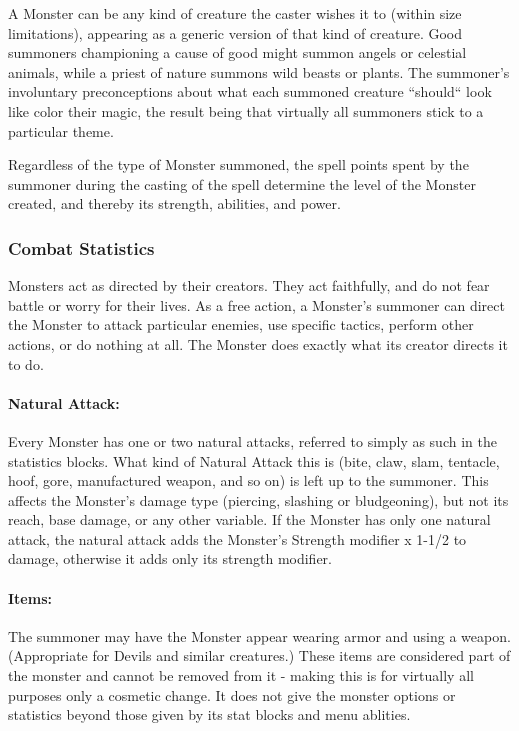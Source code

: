 A Monster can be any kind of creature the caster wishes it to (within size limitations), 
appearing as a generic version of that kind of creature.
Good summoners championing a cause of good might summon angels or celestial animals, while a priest of nature
summons wild beasts or plants.
The summoner's involuntary preconceptions about what each summoned creature ``should`` look like color their magic, 
the result being that virtually all summoners stick to a particular theme.

Regardless of the type of Monster summoned, the spell points spent by the summoner during the casting
of the spell determine the level of the Monster created, and thereby its strength, abilities, and power.
\subsubsection{Combat Statistics}
Monsters act as directed by their creators. They act faithfully, and do not fear battle or worry for their lives.
As a free action, a Monster's summoner can direct the Monster to attack particular enemies, 
use specific tactics, perform other actions, or do nothing at all. 
The Monster does exactly what its creator directs it to do.

\paragraph{Natural Attack:} Every Monster has one or two natural attacks, referred to simply as such in the statistics blocks.
What kind of Natural Attack this is (bite, claw, slam, tentacle, hoof, gore, manufactured weapon, and so on) is left up to the summoner.
This affects the Monster's damage type (piercing, slashing or bludgeoning), but not its reach, base damage, or any other variable.
If the Monster has only one natural attack, the natural attack adds the Monster's Strength modifier x 1-1/2 to damage, otherwise it adds only
its strength modifier.

\paragraph{Items:} The summoner may have the Monster appear wearing armor and using a weapon. (Appropriate for Devils and similar creatures.)
These items are considered part of the monster and cannot be removed from it - making this is for virtually all purposes only a cosmetic change. 
It does not give the monster options or statistics beyond those given by its stat blocks and menu ablities.

